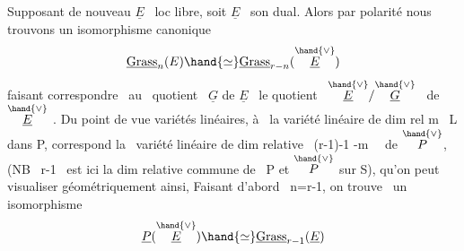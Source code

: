 Supposant de nouveau $\underline{E}$ \ loc libre, soit $\underline{E}$ \ son dual. Alors
par polarité nous trouvons un isomorphisme canonique
\[ \underline{\mathrm{Grass}}_n(E) \hand{\simeq} \underline{\mathrm{Grass}}_{r-n}(\overset{\hand{\vee}}{\underline{E}}) \]
faisant correspondre \ au \ quotient \ $\underline{G}$ de $\underline{E}$ \ le quotient \ $\overset{\hand{\vee}}{\underline{E}}/\overset{\hand{\vee}}{\underline{G}}$ \ de $\overset{\hand{\vee}}{\underline{E}}$ .
Du point de vue variétés linéaires, à \ la variété linéaire de dim rel
m \ L dans P, correspond la \ variété linéaire de dim relative
 \ (r-1)-1 -m \ \ de $\overset{\hand{\vee}}{P}$, (NB \ r-1 \ est ici la dim relative
commune de \ P et $\overset{\hand{\vee}}{P}$ sur S), qu'on peut visualiser géométriquement ainsi,
Faisant d'abord \ n=r-1, on trouve \ un isomorphisme
\[ \underline{P}(\overset{\hand{\vee}}{\underline{E}}) \hand{\simeq} \underline{\mathrm{Grass}}_{r-1}(\underline{E}) \]

